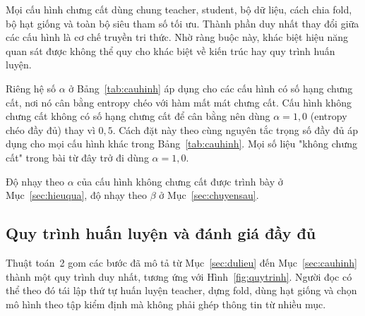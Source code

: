 Mọi cấu hình chưng cất dùng chung teacher, student, bộ dữ liệu, cách chia
fold, bộ hạt giống và toàn bộ siêu tham số tối ưu. Thành phần duy nhất thay
đổi giữa các cấu hình là cơ chế truyền tri thức. Nhờ ràng buộc này, khác
biệt hiệu năng quan sát được không thể quy cho khác biệt về kiến trúc hay
quy trình huấn luyện.

Riêng hệ số $\alpha$ ở Bảng~\ref{tab:cauhinh} áp dụng cho các cấu hình có
số hạng chưng cất, nơi nó cân bằng entropy chéo với hàm mất mát chưng cất.
Cấu hình không chưng cất không có số hạng chưng cất để cân bằng nên dùng
$\alpha = 1{,}0$ (entropy chéo đầy đủ) thay vì $0{,}5$. Cách đặt này theo
cùng nguyên tắc trọng số đầy đủ áp dụng cho mọi cấu hình khác trong
Bảng~\ref{tab:cauhinh}. Mọi số liệu "không chưng cất" trong bài từ đây
trở đi dùng $\alpha = 1{,}0$.

Độ nhạy theo $\alpha$ của cấu hình không chưng cất được trình bày ở
Mục~\ref{sec:hieuqua}, độ nhạy theo $\beta$ ở Mục~\ref{sec:chuyensau}.

\subsection{Quy trình huấn luyện và đánh giá đầy đủ}
\label{sec:pipeline}

Thuật toán~2 gom các bước đã mô tả từ Mục~\ref{sec:dulieu} đến
Mục~\ref{sec:cauhinh} thành một quy trình duy nhất, tương ứng với
Hình~\ref{fig:quytrinh}. Người đọc có thể theo đó tái lập thứ tự huấn
luyện teacher, dựng fold, dùng hạt giống và chọn mô hình theo tập kiểm định
mà không phải ghép thông tin từ nhiều mục.

